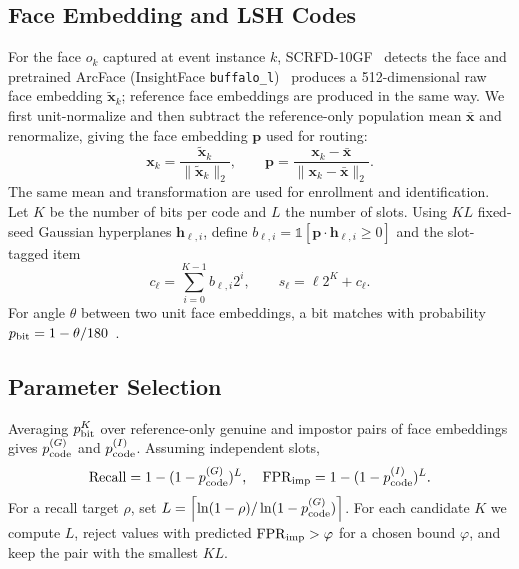 \documentclass[pdflatex,sn-mathphys-num]{sn-jnl}%
\providecommand{\code}[1]{\texttt{#1}}%
\theoremstyle{thmstyleone}%
\theoremstyle{thmstyletwo}%
\theoremstyle{thmstylethree}%
\begin{document}
\subsection{Face Embedding and LSH Codes}
For the face $o_k$ captured at event instance $k$, SCRFD-10GF~\cite{guo2022} detects the face and pretrained ArcFace (InsightFace \code{buffalo\_l})~\cite{deng2019} produces a 512-dimensional raw face embedding $\tilde{\mathbf{x}}_k$; reference face embeddings are produced in the same way. We first unit-normalize and then subtract the reference-only population mean $\bar{\mathbf{x}}$ and renormalize, giving the face embedding $\mathbf{p}$ used for routing:
\begin{equation}
\mathbf{x}_k=\frac{\tilde{\mathbf{x}}_k}{\|\tilde{\mathbf{x}}_k\|_2},\qquad
\mathbf{p}=\frac{\mathbf{x}_k-\bar{\mathbf{x}}}{\|\mathbf{x}_k-\bar{\mathbf{x}}\|_2}.
\label{eq:preprocess}
\end{equation}
The same mean and transformation are used for enrollment and identification. Let $K$ be the number of bits per code and $L$ the number of slots. Using $KL$ fixed-seed Gaussian hyperplanes $\mathbf{h}_{\ell,i}$, define $b_{\ell,i}=\mathbb{1}[\mathbf{p}\cdot\mathbf{h}_{\ell,i}\geq0]$ and the slot-tagged item
\begin{equation}
c_\ell=\sum_{i=0}^{K-1}b_{\ell,i}2^i,\qquad s_\ell=\ell2^K+c_\ell.
\label{eq:lsh-code}
\end{equation}
For angle $\theta$ between two unit face embeddings, a bit matches with probability $p_{\rm bit}=1-\theta/180$~\cite{charikar2002}.

\subsection{Parameter Selection}
Averaging $p_{\rm bit}^K$ over reference-only genuine and impostor pairs of face embeddings gives $p_{\rm code}^{(G)}$ and $p_{\rm code}^{(I)}$. Assuming independent slots,
\begin{equation}
\mathrm{Recall}=1-(1-p_{\rm code}^{(G)})^L,\quad
\mathrm{FPR}_{\rm imp}=1-(1-p_{\rm code}^{(I)})^L.
\label{eq:lsh-recall}
\end{equation}
For a recall target $\rho$, set $L=\left\lceil\ln(1-\rho)/\ln(1-p_{\rm code}^{(G)})\right\rceil$. For each candidate $K$ we compute $L$, reject values with predicted $\mathrm{FPR}_{\rm imp}>\varphi$ for a chosen bound $\varphi$, and keep the pair with the smallest $KL$.
\end{document}
